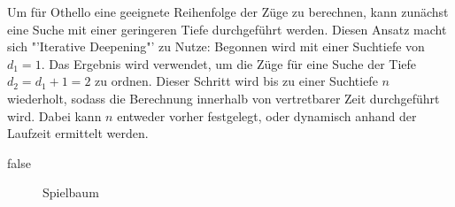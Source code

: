 Um für Othello eine geeignete Reihenfolge der Züge zu berechnen, kann zunächst eine Suche mit einer geringeren Tiefe durchgeführt werden.
Diesen Ansatz macht sich "'Iterative Deepening"' zu Nutze:
Begonnen wird mit einer Suchtiefe von \(d_1=1\).
Das Ergebnis wird verwendet, um die Züge für eine Suche der Tiefe \(d_2=d_1+1=2\) zu ordnen.
Dieser Schritt wird bis zu einer Suchtiefe \(n\) wiederholt, sodass die Berechnung innerhalb von vertretbarer Zeit durchgeführt wird.
Dabei kann \(n\) entweder vorher festgelegt, oder dynamisch anhand der Laufzeit ermittelt werden.
\cite{alphabetaefficiency}

\ifx false
\begin{figure}[]
    \centering
    \caption{Spielbaum}
    \label{fig:game_tree}
\end{figure}
\fi


